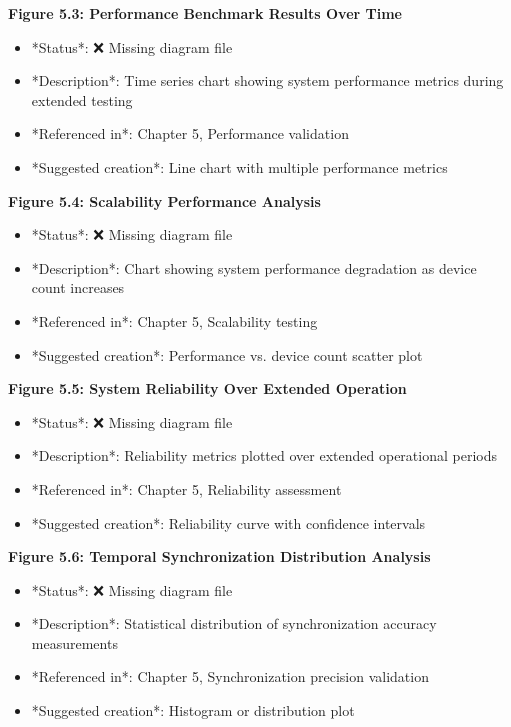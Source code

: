 \documentclass[11pt,a4paper]{article}
\begin{document}
{{\begin{itemize}
\end{itemize}
\textbf{Figure 5.3: Performance Benchmark Results Over Time}

\begin{itemize}
\item *Status*: ❌ Missing diagram file
\item *Description*: Time series chart showing system performance metrics during extended testing
\item *Referenced in*: Chapter 5, Performance validation
\item *Suggested creation*: Line chart with multiple performance metrics

\end{itemize}
\textbf{Figure 5.4: Scalability Performance Analysis}

\begin{itemize}
\item *Status*: ❌ Missing diagram file
\item *Description*: Chart showing system performance degradation as device count increases
\item *Referenced in*: Chapter 5, Scalability testing
\item *Suggested creation*: Performance vs. device count scatter plot

\end{itemize}
\textbf{Figure 5.5: System Reliability Over Extended Operation}

\begin{itemize}
\item *Status*: ❌ Missing diagram file
\item *Description*: Reliability metrics plotted over extended operational periods
\item *Referenced in*: Chapter 5, Reliability assessment
\item *Suggested creation*: Reliability curve with confidence intervals

\end{itemize}
\textbf{Figure 5.6: Temporal Synchronization Distribution Analysis}

\begin{itemize}
\item *Status*: ❌ Missing diagram file
\item *Description*: Statistical distribution of synchronization accuracy measurements
\item *Referenced in*: Chapter 5, Synchronization precision validation
\item *Suggested creation*: Histogram or distribution plot


\end{itemize}}}
\end{document}
